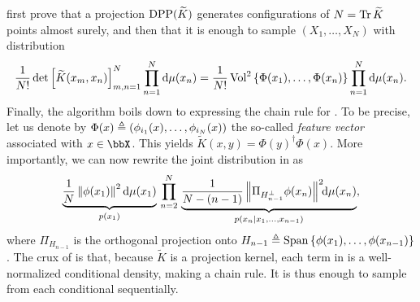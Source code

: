 \documentclass[twoside,11pt]{article}
\begin{document}
      \cite{HKPV06} first prove that a projection $\operatorname{DPP}(\widetilde{K})$ generates configurations of $N=\operatorname{Tr} \widetilde{K}$ points almost surely, and then that it is enough to sample $(X_1,\dots,X_N)$ with distribution
      \begin{equation}
      \label{eq:joint_distribution1}
      \frac{1}{N!} \det \left[ \widetilde K(x_m,x_n) \right]_{m,n=1}^N \prod_{n=1}^N\mathop{}\!\mathrm{d} \mu(x_n) = \frac{1}{N!} \operatorname{Vol}^2\left\{ \Phi(x_1),\dots,\Phi(x_n) \right\} \prod_{n=1}^N \mathop{}\!\mathrm{d}\mu(x_n).
      \end{equation}
      Finally, the algorithm boils down to expressing the chain rule for .
      To be precise, let us denote by $\Phi(x) \triangleq \left( \phi_{i_1}(x),\dots,\phi_{i_N}(x) \right)$ the so-called \emph{feature vector} associated with $x\in\bbX$. This yields $\tilde{K}(x,y) = \Phi(y)^{\dagger} \Phi(x)$. More importantly, we can now rewrite the joint distribution in  as
      \begin{equation}
      \label{eq:joint_distribution2}
       \underbrace{\frac{1}{N} \left\| \phi(x_1) \right\|^2\mathop{}\!\mathrm{d}\mu(x_1)}_{p(x_1)} \,\prod_{n=2}^{N}\, \underbrace{\frac{1}{N-(n-1)} \left\|  \Pi_{H_{n-1}^{\perp}} \phi(x_n) \right\|^2\!\! \mathop{}\!\mathrm{d}\mu(x_n)}_{p(x_n\vert x_1,\dots,x_{n-1})},
      \end{equation}
	    where $\Pi_{H_{n-1}}$ is the orthogonal projection onto $H_{n-1} \triangleq \operatorname{Span}\left\{ \phi(x_1), \dots, \phi(x_{n-1})  \right\}$.
      The crux of \cite[Algorithm 18]{HKPV06} is that, because $\tilde K$ is a projection kernel, each term in  is a well-normalized conditional density, making  a chain rule.
      It is thus enough to sample from each conditional sequentially.
\end{document}

